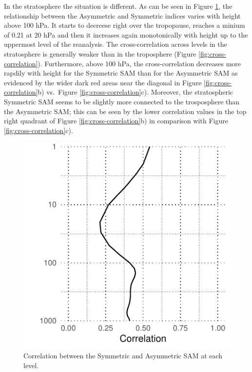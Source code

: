\documentclass[]{ametsocV5}
\begin{document}
In the stratosphere the situation is different. As can be seen in Figure
\ref{fig:cor-lev}, the relationship between the Asymmetric and Symmetric
indices varies with height above 100 hPa. It starts to decreese right
over the tropopause, reaches a minium of 0.21 at 20 hPa and then it
increases again monotonically with height up to the uppermost level of
the reanalysis. The cross-correlation across levels in the stratosphere
is generally weaker than in the troposphere (Figure
\ref{fig:cross-correlation}). Furthermore, above 100 hPa, the
cross-correlation decreases more rapdily with height for the Symmetric
SAM than for the Asymmetric SAM as evidenced by the wider dark red areas
near the diagonal in Figure \ref{fig:cross-correlation}b) vs.~Figure
\ref{fig:cross-correlation}c). Moreover, the stratospheric Symmetric SAM
seems to be slightly more connected to the trosposphere than the
Asymmetric SAM; this can be seen by the lower correlation values in the
top right quadrant of Figure \ref{fig:cross-correlation}b) in comparison
with Figure \ref{fig:cross-correlation}c).

\begin{figure}
\includegraphics{cor-lev-1} \caption[Correlation between the Symmetric and Asymmetric SAM at each level]{Correlation between the Symmetric and Asymmetric SAM at each level.}\label{fig:cor-lev}
\end{figure}
\end{document}
